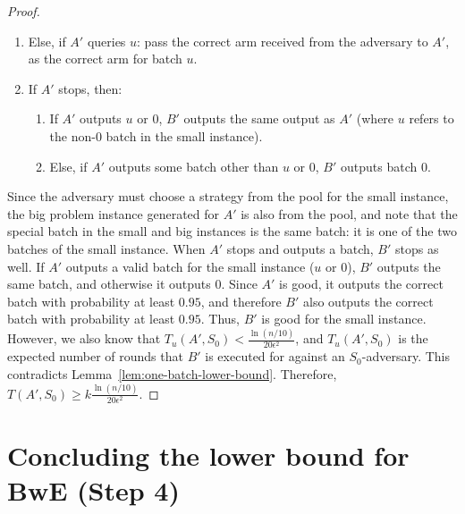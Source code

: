 \documentclass[a4paper,11pt]{article}
\theoremstyle{definition}
\newcommand{\Ber}{\mathrm{Ber}}
\begin{document}
\begin{proof}
\begin{enumerate}
\begin{enumerate}
            \begin{enumerate}
                \item $B'$ draws the correct arm of $u'$ according to $\Ber(1/2)$ and passes the outcome to $A'$.
                \item $B'$ generates advice for all batches of the big instance according to the policy described in Section~\ref{sec:restricted-step0}, and passes it to $A'$.
                \item Return to Item~\ref{itm:loop-start}.
            \end{enumerate}
            \item Else, if $A'$ queries $u$: pass the correct arm received from the adversary to $A'$, as the correct arm for batch $u$.
            \item If $A'$ stops, then:
            \begin{enumerate}
                \item If $A'$ outputs $u$ or $0$, $B'$ outputs the same output as $A'$ (where $u$ refers to the non-$0$ batch in the small instance).
                \item Else, if $A'$ outputs some batch other than $u$ or $0$, $B'$ outputs batch $0$.
            \end{enumerate}  
        \end{enumerate}
    \end{enumerate}

    Since the adversary must choose a strategy from the pool for the small instance, the big problem instance generated for $A'$ is also from the pool, and note that the special batch in the small and big instances is the same batch: it is one of the two batches of the small instance.
    When $A'$ stops and outputs a batch, $B'$ stops as well. If $A'$ outputs a valid batch for the small instance ($u$ or $0$), $B'$ outputs the same batch, and otherwise it outputs $0$. Since $A'$ is good, it outputs the correct batch with probability at least $0.95$, and therefore $B'$ also outputs the correct batch with probability at least $0.95$. Thus, $B'$ is good for the small instance. However, we also know that $T_u(A',S_0) <  \frac{\ln(n/10)}{20 \epsilon^2}$, and $T_u(A',S_0)$ is the expected number of rounds that $B'$ is executed for against an $S_0$-adversary. This contradicts Lemma~\ref{lem:one-batch-lower-bound}. Therefore, $T(A', S_0) \geq k \frac{\ln(n/10)}{20 \epsilon^2}$.
\end{proof}

\section{Concluding the lower bound for BwE (Step 4)}
\end{document}
